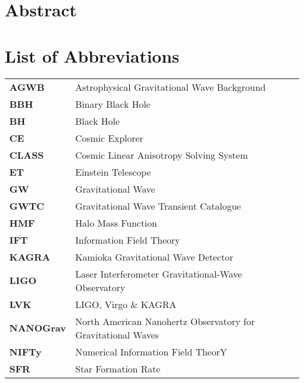 \documentclass[twoside, 12pt, openany]{book}
\begin{document}
\setcounter{tocdepth}{3}
\frontmatter
{}

\chapter*{Abstract}


\chapter*{List of Abbreviations}

\begin{table}[h]
        \begin{tabular}{l l}
            \textbf{AGWB} & Astrophysical Gravitational Wave Background
            \\
            \textbf{BBH} & Binary Black Hole
            \\
            \textbf{BH} & Black Hole
            \\
            \textbf{CE} & Cosmic Explorer
            \\
            \textbf{CLASS} & Cosmic Linear Anisotropy Solving System 
            \\
            \textbf{ET} & Einstein Telescope
            \\
            \textbf{GW} & Gravitational Wave
            \\
            \textbf{GWTC} & Gravitational Wave Transient Catalogue
            \\
            \textbf{HMF} & Halo Mass Function
            \\
            \textbf{IFT} & Information Field Theory
            \\
            \textbf{KAGRA} & Kamioka Gravitational Wave Detector
            \\
            \textbf{LIGO} & Laser Interferometer Gravitational-Wave Observatory
            \\
            \textbf{LVK} & LIGO, Virgo \& KAGRA
            \\
            \textbf{NANOGrav} & North American Nanohertz Observatory for Gravitational Waves
            \\
            \textbf{NIFTy} & Numerical Information Field TheorY
            \\
            \textbf{SFR} & Star Formation Rate

        \end{tabular}
\end{table}
\end{document}
